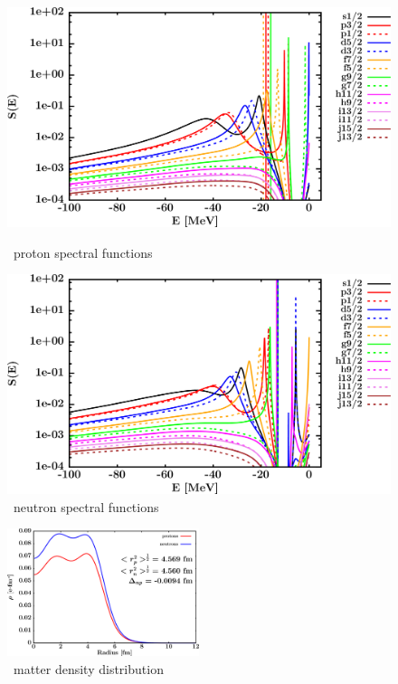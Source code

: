 \begin{figure}[H]
    \centering
    \begin{minipage}{0.45\textwidth}
        \centering
        \includegraphics[width=1.0\textwidth]{figures/sn112_protonSpectralFunctions.png}
        \caption{\snTwelve\ proton spectral functions}
        \label{DOMFitData_sn112_proton_spectralFunctions}
    \end{minipage}\hfill
    \begin{minipage}{0.45\textwidth}
        \centering
        \includegraphics[width=1.0\textwidth]{figures/sn112_neutronSpectralFunctions.png}
        \caption{\snTwelve\ neutron spectral functions}
        \label{DOMFitData_sn112_neutron_spectralFunctions}
    \end{minipage}
\end{figure}

\begin{figure}[H]
    \centering
    \includegraphics[width = 0.5\textwidth]{figures/sn112_matterDensity.png}
    \caption{\snTwelve\ matter density distribution}
    \label{DOMFitData_sn112_matterDensity}
\end{figure}

